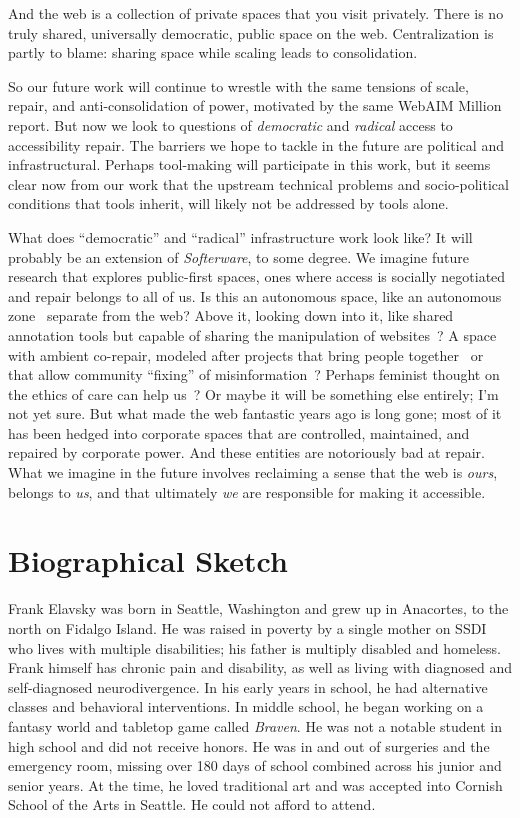 \documentclass[12pt]{cmuthesis}
\begin{document}
And the web is a collection of private spaces that you visit privately. There is no truly shared, universally democratic, public space on the web. Centralization is partly to blame: sharing space while scaling leads to consolidation.

So our future work will continue to wrestle with the same tensions of scale, repair, and anti-consolidation of power, motivated by the same WebAIM Million report. But now we look to questions of \textit{democratic} and \textit{radical} access to accessibility repair. The barriers we hope to tackle in the future are political and infrastructural. Perhaps tool-making will participate in this work, but it seems clear now from our work that the upstream technical problems and socio-political conditions that tools inherit, will likely not be addressed by tools alone.

What does ``democratic'' and ``radical'' infrastructure work look like? It will probably be an extension of \textit{Softerware}, to some degree. We imagine future research that explores public-first spaces, ones where access is socially negotiated and repair belongs to all of us. Is this an autonomous space, like an autonomous zone~\cite{Bey1991} separate from the web? Above it, looking down into it, like shared annotation tools but capable of sharing the manipulation of websites~\cite{RulandStaines2018}? A space with ambient co-repair, modeled after projects that bring people together~\cite{Shakeri2024} or that allow community ``fixing'' of misinformation~\cite{Jahanbakhsh2022}? Perhaps feminist thought on the ethics of care can help us~\cite{Henriques2025,Maeckelberghe2004}? Or maybe it will be something else entirely; I'm not yet sure. But what made the web fantastic years ago is long gone; most of it has been hedged into corporate spaces that are controlled, maintained, and repaired by corporate power. And these entities are notoriously bad at repair. What we imagine in the future involves reclaiming a sense that the web is \textit{ours}, belongs to \textit{us}, and that ultimately \textit{we} are responsible for making it accessible.

\chapter{Biographical Sketch}

Frank Elavsky was born in Seattle, Washington and grew up in Anacortes, to the north on Fidalgo Island. He was raised in poverty by a single mother on SSDI who lives with multiple disabilities; his father is multiply disabled and homeless. Frank himself has chronic pain and disability, as well as living with diagnosed and self-diagnosed neurodivergence. In his early years in school, he had alternative classes and behavioral interventions. In middle school, he began working on a fantasy world and tabletop game called \textit{Braven}. He was not a notable student in high school and did not receive honors. He was in and out of surgeries and the emergency room, missing over 180 days of school combined across his junior and senior years. At the time, he loved traditional art and was accepted into Cornish School of the Arts in Seattle. He could not afford to attend.
\end{document}
